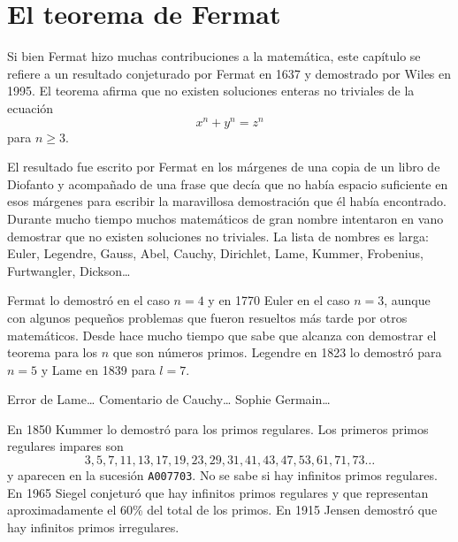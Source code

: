 \chapter{El teorema de Fermat}

Si bien Fermat hizo muchas contribuciones a la matemática, este capítulo se refiere
a un resultado conjeturado por Fermat en 1637 y demostrado por Wiles en 1995. El teorema afirma
que no existen soluciones enteras no triviales 
de la ecuación
\[
	x^n+y^n=z^n
\]
para $n\geq3$. 

El resultado fue escrito por Fermat en los márgenes de una copia de un libro de
Diofanto y acompañado de una frase que decía que no había espacio suficiente en
esos márgenes para escribir la maravillosa demostración que él había
encontrado.  Durante mucho tiempo muchos matemáticos de gran nombre intentaron
en vano demostrar que no existen soluciones no triviales. La lista de nombres
es larga: Euler, Legendre, Gauss, Abel, Cauchy, Dirichlet, Lame, Kummer,
Frobenius, Furtwangler, Dickson\dots 

Fermat lo demostró en el caso $n=4$ y en 1770 Euler en el caso $n=3$, aunque
con algunos pequeños problemas que fueron resueltos más tarde por otros
matemáticos. Desde hace mucho tiempo que sabe que alcanza con demostrar el
teorema para los $n$ que son números primos.  Legendre en 1823 lo demostró para
$n=5$ y Lame en 1839 para $l=7$. 

Error de Lame\dots
Comentario de Cauchy\dots
Sophie Germain\dots

En 1850 Kummer lo demostró para los primos regulares. 
Los primeros primos regulares impares son
\[
    3, 5, 7, 11, 13, 17, 19, 23, 29, 31, 41, 43, 47, 53, 61, 71, 73\dots
\]
y aparecen en la sucesión \verb+A007703+. No se sabe si hay infinitos primos
regulares. En 1965 Siegel conjeturó que hay infinitos primos regulares y que representan
aproximadamente el 60\% del total de los primos. En 1915 Jensen 
demostró que 
hay infinitos primos irregulares.





